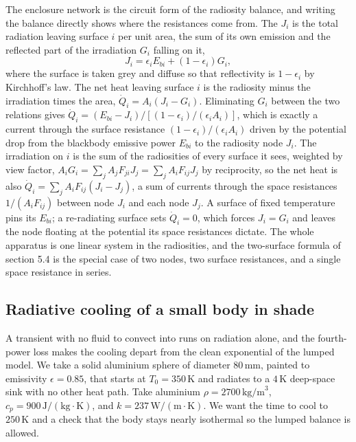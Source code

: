 \begin{mastery}
The enclosure network is the circuit form of the radiosity balance, and
writing the balance directly shows where the resistances come from. The
 $J_i$ is the total radiation leaving surface $i$ per
unit area, the sum of its own emission and the reflected part of the
irradiation $G_i$ falling on it,
\[
J_i = \epsilon_i E_{bi} + (1 - \epsilon_i) G_i,
\]
where the surface is taken grey and diffuse so that reflectivity is
$1 - \epsilon_i$ by Kirchhoff's law. The net heat leaving surface $i$ is
the radiosity minus the irradiation times the area, $\dot{Q}_i =
A_i(J_i - G_i)$. Eliminating $G_i$ between the two relations gives
$\dot{Q}_i = (E_{bi} - J_i)/[(1-\epsilon_i)/(\epsilon_i A_i)]$, which is
exactly a current through the surface resistance $(1-\epsilon_i)/
(\epsilon_i A_i)$ driven by the potential drop from the blackbody emissive
power $E_{bi}$ to the radiosity node $J_i$. The irradiation on $i$ is the
sum of the radiosities of every surface it sees, weighted by view factor,
$A_i G_i = \sum_j A_j F_{ji} J_j = \sum_j A_i F_{ij} J_j$ by reciprocity,
so the net heat is also $\dot{Q}_i = \sum_j A_i F_{ij}(J_i - J_j)$, a sum
of currents through the space resistances $1/(A_i F_{ij})$ between node
$J_i$ and each node $J_j$. A surface of fixed temperature pins its
$E_{bi}$; a re-radiating surface sets $\dot{Q}_i = 0$, which forces
$J_i = G_i$ and leaves the node floating at the potential its space
resistances dictate. The whole apparatus is one linear system in the
radiosities, and the two-surface formula of section 5.4 is the special
case of two nodes, two surface resistances, and a single space resistance
in series.
\end{mastery}

\subsection{Radiative cooling of a small body in shade}

A transient with no fluid to convect into runs on radiation alone, and
the fourth-power loss makes the cooling depart from the clean exponential
of the lumped model. We take a solid aluminium sphere of diameter
$80\,\si{\milli\meter}$, painted to emissivity $\epsilon = 0.85$, that
starts at $T_0 = 350\,\si{\kelvin}$ and radiates to a $4\,\si{\kelvin}$
deep-space sink with no other heat path. Take aluminium $\rho =
2700\,\text{kg/m}^3$, $c_p = 900\,\text{J}/(\text{kg}\cdot\si{\kelvin})$,
and $k = 237\,\text{W}/(\text{m}\cdot\si{\kelvin})$. We want the time to
cool to $250\,\si{\kelvin}$ and a check that the body stays nearly
isothermal so the lumped balance is allowed.


